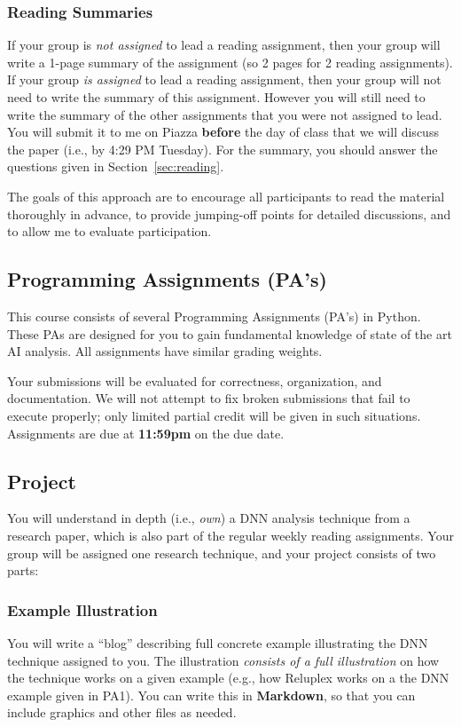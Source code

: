 \documentclass[11pt]{article}
\begin{document}
\subsubsection{Reading Summaries} 

If your group is \emph{not assigned} to lead a reading assignment, then your group will write a 1-page summary of the assignment (so 2 pages for 2 reading assignments). 
If your group \emph{is assigned} to lead a reading assignment, then your group will not need to write the summary of this assignment. However you will still need to write the summary of the other assignments that you were not assigned to lead.
You will submit it to me on Piazza \textbf{before} the day of class that we will discuss the paper (i.e., by 4:29 PM Tuesday).  For the summary, you should answer the questions given in Section~\ref{sec:reading}.

The goals of this approach are to encourage all participants to read the material thoroughly in advance, to provide jumping-off points for detailed discussions, and to allow me to evaluate participation.

\subsection{Programming Assignments (PA's)}

This course consists of several Programming Assignments (PA's) in Python. These PAs are designed for you to gain fundamental knowledge of state of the art AI analysis. All assignments have similar grading weights.

Your submissions will be evaluated for correctness,
organization, and documentation. We will not attempt to fix broken
submissions that fail to execute properly; only limited partial credit will be given in such situations. Assignments are due at \textbf{11:59pm} on the due date.

    

\subsection{Project}
\label{sec:org6da900e}

You will understand in depth (i.e., \emph{own}) a DNN analysis technique from a research paper, which is also part of the regular weekly reading assignments.  Your group will be assigned one research technique, and your project consists of two parts:

\subsubsection{Example Illustration}
\label{sec:orga9923fc}
You will write a ``blog'' describing full concrete example illustrating the DNN technique assigned to you. %
The illustration \emph{consists of a full illustration} on how the technique works on a given example (e.g., how Reluplex works on a the DNN example given in PA1).  
You can write this in \textbf{Markdown}, so that you can include graphics and other files as needed.
\end{document}
